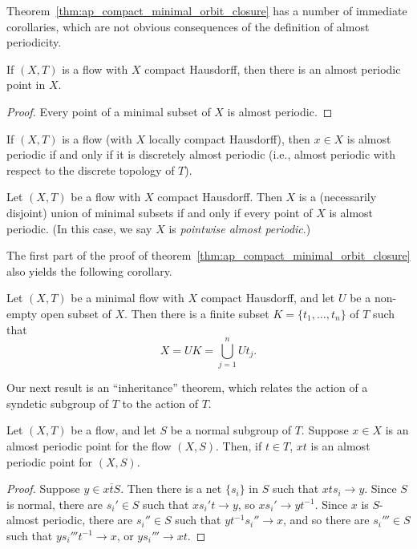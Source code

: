 Theorem~\ref{thm:ap_compact_minimal_orbit_closure} has a number of immediate corollaries, which are not obvious consequences of the definition of almost periodicity.

\begin{corollary}
    If $(X,T)$ is a flow with $X$ compact Hausdorff, then there is an almost periodic point in $X$.
\end{corollary}

\begin{proof}
    Every point of a minimal subset of $X$ is almost periodic.
\end{proof}


\begin{corollary}
    If $(X,T)$ is a flow (with $X$ locally compact Hausdorff), then $x \in X$ is almost periodic if and only if it is discretely almost periodic (i.e., almost periodic with respect to the discrete topology of $T$).
\end{corollary}


\begin{corollary}
    Let $(X,T)$ be a flow with $X$ compact Hausdorff. Then $X$ is a (necessarily disjoint) union of minimal subsets if and only if every point of $X$ is almost periodic. (In this case, we say $X$ is \emph{pointwise almost periodic}.)
\end{corollary}


The first part of the proof of theorem~\ref{thm:ap_compact_minimal_orbit_closure} also yields the following corollary.


\begin{corollary}
    Let $(X,T)$ be a minimal flow with $X$ compact Hausdorff, and let $U$ be a non-empty open subset of $X$. Then there is a finite subset $K = \{t_1, \ldots, t_n\}$ of $T$ such that
    \[
        X = UK = \bigcup_{j=1}^{n} U t_j.
    \]
\end{corollary}

Our next result is an ``inheritance'' theorem, which relates the action of a syndetic subgroup of $T$ to the action of $T$.



\begin{lemma}
    Let $(X,T)$ be a flow, and let $S$ be a normal subgroup of $T$. Suppose $x \in X$ is an almost periodic point for the flow $(X,S)$. Then, if $t \in T$, $xt$ is an almost periodic point for $(X,S)$.
\end{lemma}

\begin{proof}
    Suppose $y \in \overline{xtS}$. Then there is a net $\{s_i\}$ in $S$ such that $xts_i \to y$. Since $S$ is normal, there are $s_i' \in S$ such that $xs_i't \to y$, so $xs_i' \to yt^{-1}$. Since $x$ is $S$-almost periodic, there are $s_i'' \in S$ such that $yt^{-1}s_i'' \to x$, and so there are $s_i''' \in S$ such that $ys_i'''t^{-1} \to x$, or $ys_i''' \to xt$.
\end{proof}


